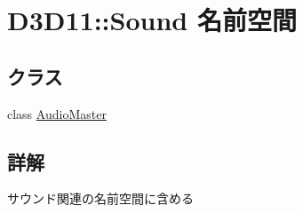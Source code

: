 \hypertarget{namespace_d3_d11_1_1_sound}{}\section{D3\+D11\+:\+:Sound 名前空間}
\label{namespace_d3_d11_1_1_sound}
\subsection*{クラス}
\begin{DoxyCompactItemize}
\item 
class \hyperlink{class_d3_d11_1_1_sound_1_1_audio_master}{Audio\+Master}
\end{DoxyCompactItemize}


\subsection{詳解}
サウンド関連の名前空間に含める 